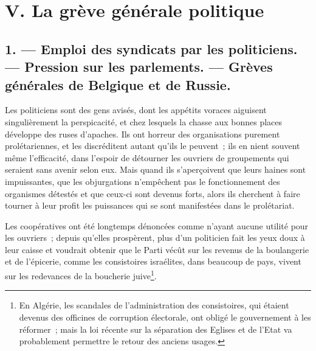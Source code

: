 \documentclass[french,twoside]{book} %
\begin{document}
  \section[{V. La grève générale politique}]{V. La grève générale politique}
\label{p19}\renewcommand{\leftmark}{V. La grève générale politique}

\subsection[{1. — Emploi des syndicats par les politiciens. — Pression sur les parlements. — Grèves générales de Belgique et de Russie.}]{1. — Emploi des syndicats par les politiciens. — Pression sur les parlements. — Grèves générales de Belgique et de Russie.}
\label{p20}
\noindent Les politiciens sont des gens avisés, dont les appétits voraces aiguisent singulièrement la perspicacité, et chez lesquels la chasse aux bonnes places développe des ruses d’apaches. Ils ont horreur des organisations purement prolétariennes, et les discréditent autant qu’ils le peuvent ; ils en nient souvent même l’efficacité, dans l’espoir de détourner les ouvriers de groupements qui seraient sans avenir selon eux. Mais quand ils s’aperçoivent que leurs haines sont impuissantes, que les objurgations  n’empêchent pas le fonctionnement des organismes détestés et que ceux-ci sont devenus forts, alors ils cherchent à faire tourner à leur profit les puissances qui se sont manifestées dans le prolétariat.\par
Les coopératives ont été longtemps dénoncées comme n’ayant aucune utilité pour les ouvriers ; depuis qu’elles prospèrent, plus d’un politicien fait les yeux doux à leur caisse et voudrait obtenir que le Parti vécût sur les revenus de la boulangerie et de l’épicerie, comme les consistoires israélites, dans beaucoup de pays, vivent sur les redevances de la boucherie juive\footnote{ \noindent En Algérie, les scandales de l’administration des consistoires, qui étaient devenus des officines de corruption électorale, ont obligé le gouvernement à les réformer ; mais la loi récente sur la séparation des Eglises et de l’Etat va probablement permettre le retour des anciens usages.
 }.\par
\end{document}
